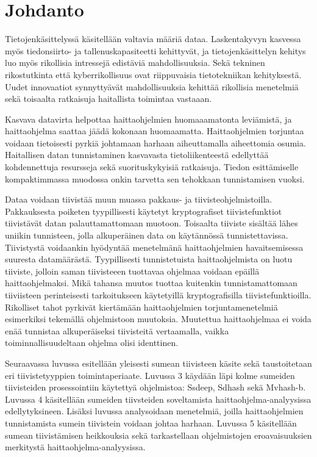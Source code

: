 \chapter{Johdanto\label{intro}}
 
Tietojenkäsittelyssä käsitellään valtavia määriä dataa. Laskentakyvyn kasvessa myös tiedonsiirto-
ja tallenuskapasiteetti kehittyvät, ja tietojenkäsittelyn kehitys luo myös rikollisia intressejä
edistäviä mahdollisuuksia. Sekä tekninen rikostutkinta että kyberrikollisuus ovat riippuvaisia
tietotekniikan kehityksestä. Uudet innovaatiot synnyttyävät mahdollisuuksia kehittää rikollisia
menetelmiä sekä toisaalta ratkaisuja haitallista toimintaa vastaaan.

Kasvava datavirta helpottaa haittaohjelmien huomaaamatonta leviämistä, ja haittaohjelma saattaa
jäädä kokonaan huomaamatta. Haittaohjelmien torjuntaa voidaan tietoisesti pyrkiä johtamaan harhaan
aiheuttamalla aiheettomia osumia. Haitallisen datan tunnistaminen kasvavasta tietoliikenteestä
edellyttää kohdennettuja resursseja sekä suorituskykyisiä ratkaisuja. Tiedon esittämiselle
kompaktimmassa muodossa onkin tarvetta sen tehokkaan tunnistamisen vuoksi.

Dataa voidaan tiivistää muun muassa pakkaus- ja tiivisteohjelmistoilla. Pakkauksesta poiketen
tyypillisesti käytetyt kryptografiset tiivistefunktiot tiivistävät datan palauttamattomaan muotoon.
Toisaalta tiiviste sisältää lähes uniikin tunnisteen, jolla alkuperäinen data on käytännössä
tunnistettavissa. Tiivistystä voidaankin hyödyntää menetelmänä haittaohjelmien havaitsemisessa
suuresta datamäärästä. Tyypillisesti tunnistetuista haittaohjelmista on luotu tiiviste, jolloin
saman tiivisteeen tuottavaa ohjelmaa voidaan epäillä haittaohjelmaksi. Mikä tahansa muutos tuottaa
kuitenkin tunnistamattomaan tiiviisteen perinteisesti tarkoitukseen käytetyillä kryptografisilla
tiivistefunktioilla. Rikolliset tahot pyrkivät kiertämään haittaohjelmien torjuntamenetelmiä
esimerkiksi tekemällä ohjelmistoon muutoksia. Muutettua haittaohjelmaa ei voida enää tunnistaa
alkuperäiseksi tiivisteitä vertaamalla, vaikka toiminnallisuudeltaan ohjelma olisi identtinen.

Seuraavassa luvussa esitellään yleisesti sumean tiivisteen käsite sekä taustoitetaan eri
tiivistetyyppien toimintaperiaate. Luvussa 3 käydään läpi kolme sumeiden tiivisteiden
prosessointiin käytettyä ohjelmistoa: Ssdeep, Sdhash sekä Mvhash-b. Luvussa 4 käsitellään
sumeiden tiivsteiden soveltamista haittaohjelma-analyysissa edellytyksineen. Lisäksi luvussa
analysoidaan menetelmiä, joilla haittaohjelmien tunnistamista sumein tiivistein voidaan johtaa
harhaan. Luvussa 5 käsitellään sumean tiivistämisen heikkouksia sekä tarkastellaan ohjelmistojen
eroavaisuuksien merkitystä haittaohjelma-analyysissa.
